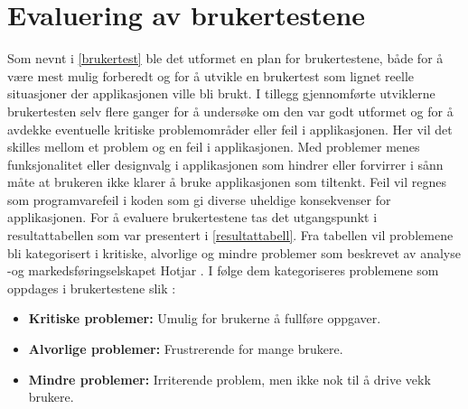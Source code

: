 \chapter{Evaluering av brukertestene}
Som nevnt i \ref{brukertest} ble det utformet en plan for brukertestene, både for å være mest mulig forberedt og for å utvikle en brukertest som lignet reelle situasjoner der applikasjonen ville bli brukt. I tillegg gjennomførte utviklerne brukertesten selv flere ganger for å undersøke om den var godt utformet og for å avdekke eventuelle kritiske problemområder eller feil i applikasjonen. Her vil det skilles mellom et problem og en feil i applikasjonen. Med problemer menes funksjonalitet eller designvalg i applikasjonen som hindrer eller forvirrer i sånn måte at brukeren ikke klarer å bruke applikasjonen som tiltenkt. Feil vil regnes som programvarefeil i koden som gi diverse uheldige konsekvenser for applikasjonen. For å evaluere brukertestene tas det utgangspunkt i resultattabellen som var presentert i \ref{resultattabell}. Fra tabellen vil problemene bli kategorisert i kritiske, alvorlige og mindre problemer som beskrevet av analyse -og markedsføringselskapet Hotjar \cite{HotjarWebsiteHeatmaps}. I følge dem kategoriseres problemene som oppdages i brukertestene slik \cite{HowAnalyzeEvaluate2020}: 
\begin{itemize}
    \item \textbf{Kritiske problemer:} Umulig for brukerne å fullføre oppgaver.
    \item \textbf{Alvorlige problemer:} Frustrerende for mange brukere.
    \item \textbf{Mindre problemer:} Irriterende problem, men ikke nok til å drive vekk brukere. 
\end{itemize}

